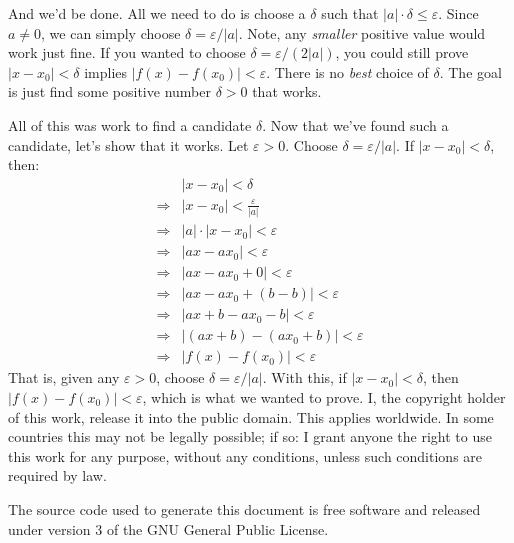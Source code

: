 \documentclass{article}
\theoremstyle{normal}
\begin{document}
    And we'd be done. All we need to do is choose a $\delta$ such that
    $|a|\cdot\delta\leq\varepsilon$. Since $a\ne{0}$, we can simply choose
    $\delta=\varepsilon/|a|$. Note, any \textit{smaller} positive value would
    work just fine. If you wanted to choose
    $\delta=\varepsilon/(2|a|)$, you could still prove
    $|x-x_{0}|<\delta$ implies $|f(x)-f(x_{0})|<\varepsilon$. There is no
    \textit{best} choice of $\delta$. The goal is just find some positive
    number $\delta>0$ that works.
    \par\hfill\par
    All of this was work to find a candidate $\delta$. Now that we've found
    such a candidate, let's show that it works. Let $\varepsilon>0$. Choose
    $\delta=\varepsilon/|a|$. If $|x-x_{0}|<\delta$, then:
    \begin{align}
        &|x-x_{0}|<\delta\tag{Hypothesis}\\
        \Rightarrow&|x-x_{0}|<\frac{\varepsilon}{|a|}
            \tag{Definition of $\delta$}\\
        \Rightarrow&|a|\cdot|x-x_{0}|<\varepsilon
            \tag{Multiply both sides by $|a|$}\\
        \Rightarrow&|ax-ax_{0}|<\varepsilon
            \tag{Distribute the $|a|$ using absolute value laws}\\
        \Rightarrow&|ax-ax_{0}+0|<\varepsilon
            \tag{Adding zero doesn't change anything}\\
        \Rightarrow&|ax-ax_{0}+(b-b)|<\varepsilon
            \tag{Since $b-b=0$}\\
        \Rightarrow&|ax+b-ax_{0}-b|<\varepsilon
            \tag{Arithmetic}\\
        \Rightarrow&|(ax+b)-(ax_{0}+b)|<\varepsilon
            \tag{Factor the minus sign}\\
        \Rightarrow&|f(x)-f(x_{0})|<\varepsilon
            \tag{Definition of $f$}
    \end{align}
    That is, given any $\varepsilon>0$, choose
    $\delta=\varepsilon/|a|$. With this, if $|x-x_{0}|<\delta$, then
    $|f(x)-f(x_{0})|<\varepsilon$, which is what we wanted to prove.
    \newpage
    I, the copyright holder of this work, release it into the public domain.
    This applies worldwide. In some countries this may not be legally possible;
    if so: I grant anyone the right to use this work for any purpose, without
    any conditions, unless such conditions are required by law.
    \par\hfill\par
    The source code used to generate this document is free software and released
    under version 3 of the GNU General Public License.
\end{document}
